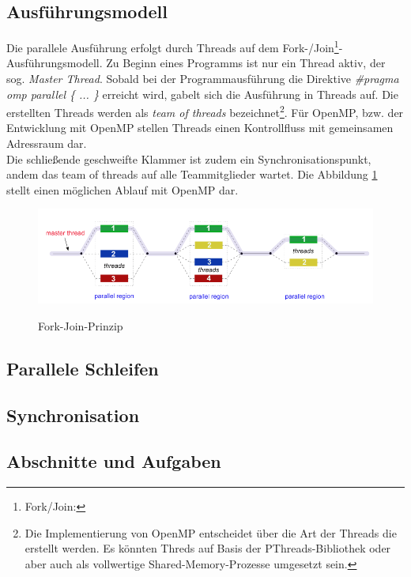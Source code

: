 \documentclass{scrartcl}
\begin{document}
\subsection{Ausführungsmodell}
Die parallele Ausführung erfolgt durch Threads auf dem Fork-/Join\footnote{Fork/Join:}-Ausführungsmodell. Zu Beginn eines Programms ist nur ein Thread aktiv, der sog. \textit{Master Thread}. Sobald bei der Programmausführung die Direktive \textit{\#pragma omp parallel \{ ... \} } erreicht wird, gabelt sich die Ausführung in Threads auf. Die erstellten Threads werden als \textit{team of threads} bezeichnet\footnote{Die Implementierung von OpenMP entscheidet über die Art der Threads die erstellt werden. Es könnten Threds auf Basis der PThreads-Bibliothek oder aber auch als vollwertige Shared-Memory-Prozesse umgesetzt sein.}. Für OpenMP, bzw. der Entwicklung mit OpenMP stellen Threads einen Kontrollfluss mit gemeinsamen Adressraum dar.  \\ 
Die schließende geschweifte Klammer ist zudem ein Synchronisationspunkt, andem das team of threads auf alle Teammitglieder wartet. Die Abbildung \ref{Join-Fork-Modell} stellt einen möglichen Ablauf mit OpenMP dar. 

\begin{figure}[h!]
  \centering
    \includegraphics[width=1.0\textwidth]{img/fork_join.png}
    \label{Join-Fork-Modell}
   \caption{Fork-Join-Prinzip}
\end{figure}



\subsection{Parallele Schleifen}
\subsection{Synchronisation}
\subsection{Abschnitte und Aufgaben}
\end{document}
